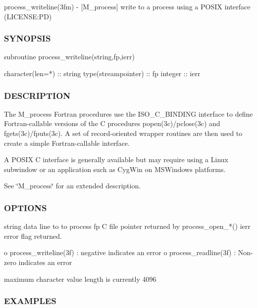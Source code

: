 process\+\_\+writeline(3fm) -\/ \mbox{[}M\+\_\+process\mbox{]} write to a process using a P\+O\+S\+IX interface (L\+I\+C\+E\+N\+SE\+:PD) 

\subsubsection*{S\+Y\+N\+O\+P\+S\+IS}

\begin{DoxyVerb} subroutine process_writeline(string,fp,ierr)

   character(len=*)    :: string
   type(streampointer) :: fp
   integer             :: ierr
\end{DoxyVerb}


\subsubsection*{D\+E\+S\+C\+R\+I\+P\+T\+I\+ON}

The M\+\_\+process Fortran procedures use the I\+S\+O\+\_\+\+C\+\_\+\+B\+I\+N\+D\+I\+NG interface to define Fortran-\/callable versions of the C procedures popen(3c)/pclose(3c) and fgets(3c)/fputs(3c). A set of record-\/oriented wrapper routines are then used to create a simple Fortran-\/callable interface.

A P\+O\+S\+IX C interface is generally available but may require using a Linux subwindow or an application such as Cyg\+Win on M\+S\+Windows platforms.

See \char`\"{}\+M\+\_\+process\char`\"{} for an extended description.

\subsubsection*{O\+P\+T\+I\+O\+NS}

\begin{DoxyVerb}string   data line to to process
fp       C file pointer returned by process_open_*()
ierr     error flag returned.

          o process_writeline(3f) : negative indicates an error
          o process_readline(3f)  : Non-zero indicates an error

maximum character value length is currently 4096
\end{DoxyVerb}


\subsubsection*{E\+X\+A\+M\+P\+L\+ES}

